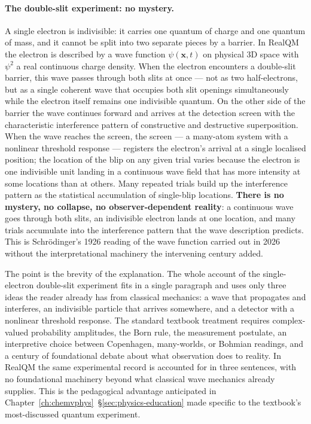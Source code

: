 \paragraph{The double-slit experiment: no mystery.}
A single electron is indivisible: it carries one quantum of charge and one quantum of mass, and it cannot be split into two separate pieces by a barrier. In RealQM the electron is described by a wave function $\psi(\mathbf{x},t)$ on physical 3D space with $\psi^2$ a real continuous charge density. When the electron encounters a double-slit barrier, this wave passes through both slits at once --- not as two half-electrons, but as a single coherent wave that occupies both slit openings simultaneously while the electron itself remains one indivisible quantum. On the other side of the barrier the wave continues forward and arrives at the detection screen with the characteristic interference pattern of constructive and destructive superposition. When the wave reaches the screen, the screen --- a many-atom system with a nonlinear threshold response --- registers the electron's arrival at a single localised position; the location of the blip on any given trial varies because the electron is one indivisible unit landing in a continuous wave field that has more intensity at some locations than at others. Many repeated trials build up the interference pattern as the statistical accumulation of single-blip locations. \textbf{There is no mystery, no collapse, no observer-dependent reality}: a continuous wave goes through both slits, an indivisible electron lands at one location, and many trials accumulate into the interference pattern that the wave description predicts. This is Schr\"odinger's 1926 reading of the wave function carried out in 2026 without the interpretational machinery the intervening century added.

The point is the brevity of the explanation. The whole account of the single-electron double-slit experiment fits in a single paragraph and uses only three ideas the reader already has from classical mechanics: a wave that propagates and interferes, an indivisible particle that arrives somewhere, and a detector with a nonlinear threshold response. The standard textbook treatment requires complex-valued probability amplitudes, the Born rule, the measurement postulate, an interpretive choice between Copenhagen, many-worlds, or Bohmian readings, and a century of foundational debate about what observation does to reality. In RealQM the same experimental record is accounted for in three sentences, with no foundational machinery beyond what classical wave mechanics already supplies. This is the pedagogical advantage anticipated in Chapter~\ref{ch:chemvphys}~\S\ref{sec:physics-education} made specific to the textbook's most-discussed quantum experiment.

